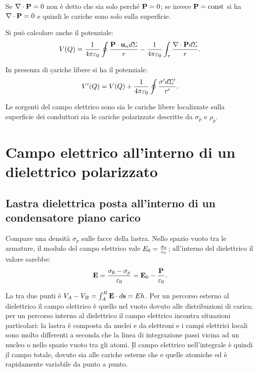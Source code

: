 Se $\nabla\cdot\mathbf{P}=0$ non è detto che sia solo perché $\mathbf{P}=0$; se invece $\mathbf{P}=\textrm{const}$ si ha $\nabla\cdot\mathbf{P}=0$ e quindi le cariche sono solo sulla superficie.

Si può calcolare anche il \b{potenziale}:
\begin{equation}\begin{split}
V(Q)=\frac{1}{4\pi\varepsilon_0}\oint{\frac{\mathbf{P\cdot u}_nd\Sigma}{r}}-\frac{1}{4\pi\varepsilon_0}\int_{\tau}{\frac{\nabla\cdot\mathbf{P}d\Sigma}{r}}.
\end{split}\end{equation}

In presenza di \b{cariche libere} si ha il \b{potenziale}:
\begin{equation}\begin{split}
V'(Q)=V(Q)+\frac{1}{4\pi\varepsilon_0}\oint{\frac{\sigma'd\Sigma'}{r'}}.
\end{split}\end{equation}

Le sorgenti del campo elettrico sono sia le cariche libere localizzate sulla superficie dei conduttori sia le cariche polarizzate descritte da $\sigma_p$ e $\rho_p$.

\section{Campo elettrico all'interno di un dielettrico polarizzato}%
\subsection{Lastra dielettrica posta all'interno di un condensatore piano carico}
Compare una densità $\sigma_p$ sulle facce della lastra. Nello spazio vuoto tra le armature, il modulo del campo elettrico vale $E_0=\frac{\sigma_0}{\varepsilon_0}$; all'interno del dielettrico il valore sarebbe:
\begin{equation}\begin{split}
\mathbf{E}=\frac{\sigma_0-\sigma_p}{\varepsilon_0}=\mathbf{E}_0-\frac{\mathbf{P}}{\varepsilon_0}.
\end{split}\end{equation}

La \ddp tra due punti è $V_A-V_B=\int_A^B{\mathbf{E}\cdot d\mathbf{s}}=Eh$. Per un percorso esterno al dielettrico il campo elettrico è quello nel vuoto dovuto alle distribuzioni di carica; per un percorso interno al dielettrico il campo elettrico incontra situazioni particolari: la lastra è composta da nuclei e da elettroni e i campi elettrici locali sono molto differenti a seconda che la linea di integrazione passi vicina ad un nucleo o nello spazio vuoto tra gli atomi. \b{Il campo elettrico nell'integrale è} quindi \b{il campo totale}, dovuto sia alle cariche esterne che e quelle atomiche ed è rapidamente variabile da punto a punto.

